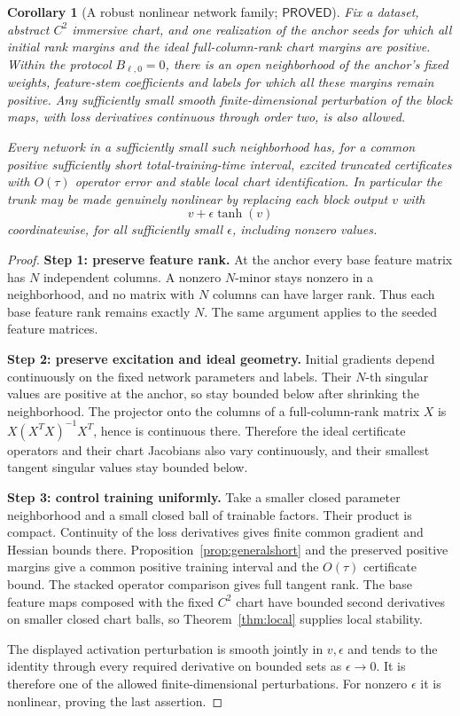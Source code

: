 \documentclass[12pt,a4paper]{article}
\theoremstyle{readable}
\newtheorem{corollary}[theorem]{Corollary}
\theoremstyle{definition}\newtheorem{example}[theorem]{Example}
\newcommand{\PP}{\mathsf{PROVED}}\newcommand{\FF}{\mathsf{FALSE}}
\begin{document}
\begin{corollary}[A robust nonlinear network family; \(\PP\)]\label{cor:open}
Fix a dataset, abstract \(C^2\) immersive chart, and one realization of the anchor seeds for which all initial rank margins and the ideal full-column-rank chart margins are positive. Within the protocol \(B_{\ell,0}=0\), there is an open neighborhood of the anchor's fixed weights, feature-stem coefficients and labels for which all these margins remain positive. Any sufficiently small smooth finite-dimensional perturbation of the block maps, with loss derivatives continuous through order two, is also allowed.

Every network in a sufficiently small such neighborhood has, for a common positive sufficiently short total-training-time interval, excited truncated certificates with \(O(\tau)\) operator error and stable local chart identification. In particular the trunk may be made genuinely nonlinear by replacing each block output \(v\) with
\[
v+\epsilon\tanh(v)
\]
coordinatewise, for all sufficiently small \(\epsilon\), including nonzero values.
\end{corollary}
\begin{proof}
\textbf{Step 1: preserve feature rank.} At the anchor every base feature matrix has \(N\) independent columns. A nonzero \(N\)-minor stays nonzero in a neighborhood, and no matrix with \(N\) columns can have larger rank. Thus each base feature rank remains exactly \(N\). The same argument applies to the seeded feature matrices.

\textbf{Step 2: preserve excitation and ideal geometry.} Initial gradients depend continuously on the fixed network parameters and labels. Their \(N\)-th singular values are positive at the anchor, so stay bounded below after shrinking the neighborhood. The projector onto the columns of a full-column-rank matrix \(X\) is
\(X(X^TX)^{-1}X^T\), hence is continuous there. Therefore the ideal certificate operators and their chart Jacobians also vary continuously, and their smallest tangent singular values stay bounded below.

\textbf{Step 3: control training uniformly.} Take a smaller closed parameter neighborhood and a small closed ball of trainable factors. Their product is compact. Continuity of the loss derivatives gives finite common gradient and Hessian bounds there. Proposition~\ref{prop:generalshort} and the preserved positive margins give a common positive training interval and the \(O(\tau)\) certificate bound. The stacked operator comparison gives full tangent rank. The base feature maps composed with the fixed \(C^2\) chart have bounded second derivatives on smaller closed chart balls, so Theorem~\ref{thm:local} supplies local stability.

The displayed activation perturbation is smooth jointly in \(v,\epsilon\) and tends to the identity through every required derivative on bounded sets as \(\epsilon\to0\). It is therefore one of the allowed finite-dimensional perturbations. For nonzero \(\epsilon\) it is nonlinear, proving the last assertion.
\end{proof}
\end{document}
